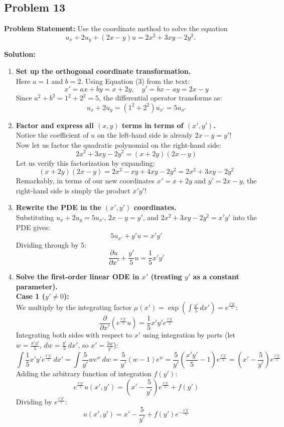 \documentclass[11pt]{article}
\begin{document}
\subsection*{Problem 13}
\textbf{Problem Statement:} Use the coordinate method to solve the equation
\[
u_x + 2u_y + (2x - y)u = 2x^2 + 3xy - 2y^2.
\]

\textbf{Solution:}
\begin{enumerate}[label=\textbf{Step \arabic*:}]
    \item \textbf{Set up the orthogonal coordinate transformation.} \\
    Here $a = 1$ and $b = 2$. Using Equation (3) from the text:
    \[
    x' = ax + by = x + 2y, \quad y' = bx - ay = 2x - y
    \]
    Since $a^2 + b^2 = 1^2 + 2^2 = 5$, the differential operator transforms as:
    \[
    u_x + 2u_y = (1^2 + 2^2)u_{x'} = 5u_{x'}
    \]

    \item \textbf{Factor and express all $(x, y)$ terms in terms of $(x', y')$.} \\
    Notice the coefficient of $u$ on the left-hand side is already $2x - y = y'$! \\
    Now let us factor the quadratic polynomial on the right-hand side:
    \[
    2x^2 + 3xy - 2y^2 = (x + 2y)(2x - y)
    \]
    Let us verify this factorization by expanding:
    \[
    (x + 2y)(2x - y) = 2x^2 - xy + 4xy - 2y^2 = 2x^2 + 3xy - 2y^2
    \]
    Remarkably, in terms of our new coordinates $x' = x + 2y$ and $y' = 2x - y$, the right-hand side is simply the product $x'y'$!

    \item \textbf{Rewrite the PDE in the $(x', y')$ coordinates.} \\
    Substituting $u_x + 2u_y = 5u_{x'}$, $2x - y = y'$, and $2x^2 + 3xy - 2y^2 = x'y'$ into the PDE gives:
    \[
    5u_{x'} + y'u = x'y'
    \]
    Dividing through by $5$:
    \[
    \frac{\partial u}{\partial x'} + \frac{y'}{5}u = \frac{1}{5}x'y'
    \]

    \item \textbf{Solve the first-order linear ODE in $x'$ (treating $y'$ as a constant parameter).} \\
    \textbf{Case 1 ($y' \neq 0$):} \\
    We multiply by the integrating factor $\mu(x') = \exp\left(\int \frac{y'}{5}\,dx'\right) = e^{\frac{x'y'}{5}}$:
    \[
    \frac{\partial}{\partial x'}\left(e^{\frac{x'y'}{5}}u\right) = \frac{1}{5}x'y'e^{\frac{x'y'}{5}}
    \]
    Integrating both sides with respect to $x'$ using integration by parts (let $w = \frac{x'y'}{5}$, $dw = \frac{y'}{5}\,dx'$, so $x' = \frac{5w}{y'}$):
    \[
    \int \frac{1}{5}x'y'e^{\frac{x'y'}{5}}\,dx' = \int \frac{5}{y'}w e^w\,dw = \frac{5}{y'}(w - 1)e^w = \frac{5}{y'}\left(\frac{x'y'}{5} - 1\right)e^{\frac{x'y'}{5}} = \left(x' - \frac{5}{y'}\right)e^{\frac{x'y'}{5}}
    \]
    Adding the arbitrary function of integration $f(y')$:
    \[
    e^{\frac{x'y'}{5}}u(x', y') = \left(x' - \frac{5}{y'}\right)e^{\frac{x'y'}{5}} + f(y')
    \]
    Dividing by $e^{\frac{x'y'}{5}}$:
    \[
    u(x', y') = x' - \frac{5}{y'} + f(y')e^{-\frac{x'y'}{5}}
    \]


\end{enumerate}
\end{document}
